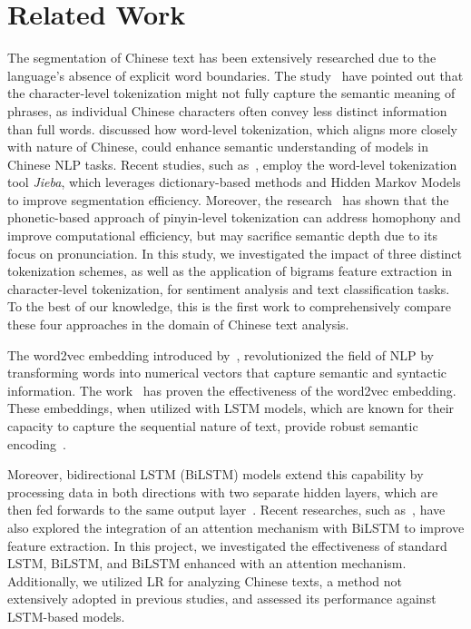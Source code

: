 \section{Related Work}
The segmentation of Chinese text has been extensively researched due to the language's absence of explicit word boundaries. The study~\citep{xue-2003-chinese} have pointed out that the character-level tokenization might not fully capture the semantic meaning of phrases, as individual Chinese characters often convey less distinct information than full words. \citep{zhou-2003-chunking} discussed how word-level tokenization, which aligns more closely with nature of Chinese, could enhance semantic understanding of models in Chinese NLP tasks. Recent studies, such as~\citep{sun2022word}, employ the word-level tokenization tool \textit{Jieba}, which leverages dictionary-based methods and Hidden Markov Models to improve segmentation efficiency. Moreover, the research~\citep{si-etal-2023-sub} has shown that the phonetic-based approach of pinyin-level tokenization can address homophony and improve computational efficiency, but may sacrifice semantic depth due to its focus on pronunciation. In this study, we investigated the impact of three distinct tokenization schemes, as well as the application of bigrams feature extraction in character-level tokenization, for sentiment analysis and text classification tasks. To the best of our knowledge, this is the first work to comprehensively compare these four approaches in the domain of Chinese text analysis. 

The word2vec embedding introduced by~\citep{mikolov2013efficient}, revolutionized the field of NLP by transforming words into numerical vectors that capture semantic and syntactic information. The work~\citep{li2018ana} has proven the effectiveness of the word2vec embedding. These embeddings, when utilized with LSTM models, which are known for their capacity to capture the sequential nature of text, provide robust semantic encoding~\citep{yuan2023}.

Moreover, bidirectional LSTM (BiLSTM) models extend this capability by processing data in both directions with two separate hidden layers, which are then fed forwards to the same output layer~\citep{graves2005}. Recent researches, such as~\citep{yuan2023}, have also explored the integration of an attention mechanism with BiLSTM to improve feature extraction. In this project, we investigated the effectiveness of standard LSTM, BiLSTM, and BiLSTM enhanced with an attention mechanism. Additionally, we utilized LR for analyzing Chinese texts, a method not extensively adopted in previous studies, and assessed its performance against LSTM-based models.

